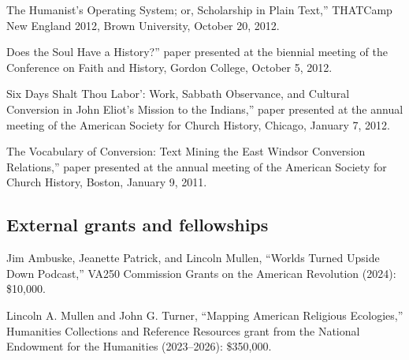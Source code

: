 \documentclass[11pt]{article}
\begin{document}
\noindent{}The Humanist's Operating System; or, Scholarship in Plain Text,'' THATCamp New England 2012, Brown University, October 20, 2012.

\noindent{}Does the Soul Have a History?'' paper presented at the biennial meeting of the Conference on Faith and History, Gordon College, October 5, 2012.

\noindent{}Six Days Shalt Thou Labor': Work, Sabbath Observance, and Cultural Conversion in John Eliot's Mission to the Indians,'' paper presented at the annual meeting of the American Society for Church History, Chicago, January 7, 2012.

\noindent{}The Vocabulary of Conversion: Text Mining the East Windsor Conversion Relations,'' paper presented at the annual meeting of the American Society for Church History, Boston, January 9, 2011.



% 

\subsection{External grants and fellowships}\label{Grants and fellowships}

Jim Ambuske, Jeanette Patrick, and Lincoln Mullen, ``Worlds Turned Upside Down Podcast,'' VA250 Commission Grants on the American Revolution (2024): \$10,000.

Lincoln A. Mullen and John G. Turner, ``Mapping American Religious Ecologies,'' Humanities Collections and Reference Resources grant from the National Endowment for the Humanities (2023--2026): \$350,000.
\end{document}

